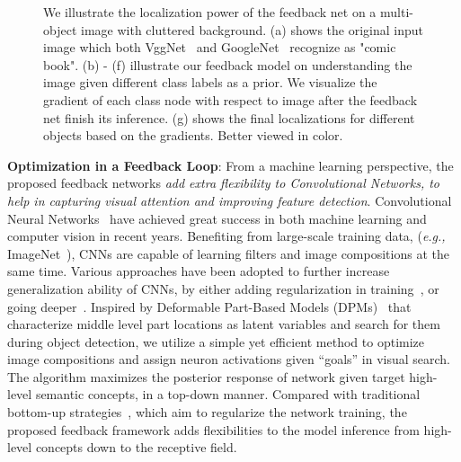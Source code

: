 \begin{figure}[htb]
\begin{center}
\begin{tabular}{ccccccc}
\end{tabular}
\caption{We illustrate the localization power of the feedback net on a multi-object image with cluttered background. (a) shows the original input image which both VggNet~\cite{Simonyan2014Very} and GoogleNet~\cite{Szegedy2014Going} recognize as "comic book". (b) - (f) illustrate our feedback model on understanding the image given different class labels as a prior. We visualize the gradient of each class node with respect to image after the feedback net finish its inference. (g) shows the final localizations for different objects based on the gradients. Better viewed in color.}
\label{fig:splah}
\end{center}
\end{figure}

\textbf{Optimization in a Feedback Loop}:
From a machine learning perspective, the proposed feedback networks \emph{add extra flexibility to Convolutional Networks, to help in capturing visual attention and improving feature detection}. Convolutional Neural Networks~\cite{lecun1998gradient, Krizhevsky2012ImageNet, Simonyan2014Very} have achieved great success in both machine learning and computer vision in recent years. Benefiting from large-scale training data, (\emph{e.g.,} ImageNet~\cite{deng2009imagenet}), CNNs are capable of learning filters and image compositions at the same time. Various approaches have been adopted to further increase generalization ability of CNNs, by either adding regularization in training~\cite{he2015delving,ioffe2015batch}, or going deeper~\cite{Simonyan2014Very, Szegedy2014Going}. Inspired by Deformable Part-Based Models (DPMs)~\cite{Felzenszwalb2010Object} that characterize middle level part locations as latent variables and search for them during object detection, we utilize a simple yet efficient method to optimize image compositions and assign neuron activations given ``goals'' in visual search. The algorithm maximizes the posterior response of network given target high-level semantic concepts, in a top-down manner. Compared with traditional bottom-up strategies~\cite{he2015delving, ioffe2015batch}, which aim to regularize the network training, the proposed feedback framework adds flexibilities to the model inference from high-level concepts down to the receptive field.

